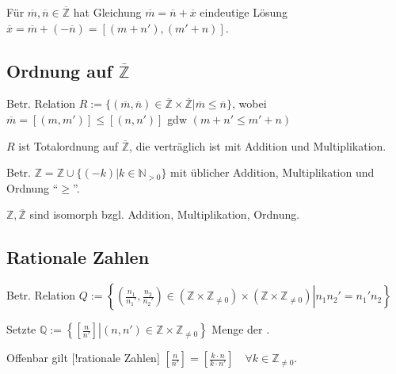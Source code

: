 \begin{satz}
	Für $\overline{m},\overline{n}\in\overline{\mathbb{Z}}$ hat Gleichung $\overline{m} = \overline{n} + \overline{x}$ eindeutige Lösung $\overline{x} = \overline{m} + (-\overline{n}) = [(m+n'),(m'+n)]$.
\end{satz}

\subsection*{Ordnung auf $\overline{\mathbb{Z}}$}
\begin{definition}
	Betr. Relation $R:=\{(\overline{m},\overline{n})\in\overline{\mathbb{Z}}\times\overline{\mathbb{Z}} | \overline{m} \le \overline{n}\}$, wobei $\overline{m} = [(m,m')] \le [(n,n')]$ \gls{gdw} $(m+n'\le m'+n)$
\end{definition}

\begin{satz}
	$R$ ist Totalordnung auf $\overline{\mathbb{Z}}$, die verträglich ist mit Addition und Multiplikation.
\end{satz}

\begin{definition}
	Betr. $\mathbb{Z} = \mathbb{Z}\cup\{ (-k) | k\in\mathbb{N}_{>0} \}$ mit üblicher Addition, Multiplikation und Ordnung "`$\ge$"'.
\end{definition}
\begin{satz}
	$\mathbb{Z},\overline{\mathbb{Z}}$ sind isomorph bzgl. Addition, Multiplikation, Ordnung.
\end{satz}

\subsection*{Rationale Zahlen}
\begin{definition}
	Betr. Relation $Q:=\left\lbrace \left. \left( \frac{n_1}{n_1'},\frac{n_2}{n_2'}\right) \in \left( \mathbb{Z}\times\mathbb{Z}_{\neq 0}\right)\times\left(\mathbb{Z}\times\mathbb{Z}_{\neq 0}\right) \right| n_1n_2' = n_1'n_2\right\rbrace$
	
	Setzte $\mathbb{Q} := \left\lbrace \left[ \left. \frac{n}{n'}\right] \right| (n,n')\in\mathbb{Z}\times\mathbb{Z}_{\neq 0}\right\rbrace$ Menge der .
	
	Offenbar gilt [!rationale Zahlen] $\left[ \frac{n}{n'}\right] = \left[ \frac{k\cdot n}{k\cdot n'}\right]\quad\forall k\in\mathbb{Z}_{\neq 0}$.
\end{definition}

